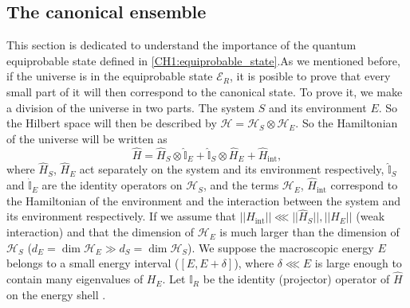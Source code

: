 \subsection{The canonical ensemble}

This section is dedicated to understand the importance of the quantum equiprobable state defined in \eqref{CH1:equiprobable_state}.As we mentioned before, if the universe is in the equiprobable state $\mathcal{E}_R$, it is posible to prove that every small part of it will then correspond to the canonical state. To prove it, we make a division of the universe in two parts. The system $S$ and its environment $E$. So the Hilbert space will then be described by $\mathcal{H}=\mathcal{H}_{S}\otimes\mathcal{H}_E$. So the Hamiltonian of the universe will be written as
\begin{equation}
\hat{H}=\hat{H}_{S} \otimes \hat{\mathbb{I}}_{E}+\hat{\mathbb{I}}_{S} \otimes \hat{H}_{E}+\hat{H}_{\mathrm{int}},
\label{CH1:Hamiltonian_split_env_system}
\end{equation}
where $\hat{H}_S$, $\hat{H}_E$ act separately on the system and its environment respectively, $\hat{\mathbb{I}}_{S}$ and $\hat{\mathbb{I}}_{E}$ are the identity operators on $\mathcal{H}_S$, and the terms $\mathcal{H}_E$, $\hat{H}_{\mathrm{int}}$ correspond to the Hamiltonian of the environment and the interaction between the system and its environment respectively. If we assume that 
$||\hat{H}_{\mathrm{int}}||\lll ||\hat{H}_{S}||, ||H_{E}||$ (weak interaction) and that the dimension of $\mathcal{H}_E$ is much larger than the dimension of $\mathcal{H}_S$ ($d_{E}=\operatorname{dim} \mathcal{H}_{E} \gg d_{S}=\operatorname{dim} \mathcal{H}_{S}$). We suppose the macroscopic energy $E$ belongs to a small energy interval ($[E,E+\delta]$), where $\delta\lll E$ is large enough to contain many eigenvalues of $H_E$. Let $\mathbb{I}_{R}$ be the identity (projector) operator of $\hat{H}$ on the energy shell .


